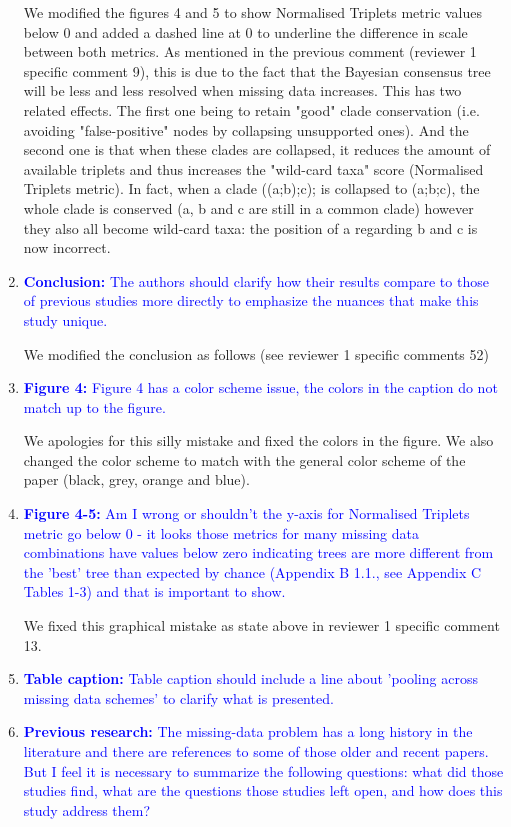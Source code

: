 \documentclass[12pt,letterpaper]{article}
\begin{document}
\begin{enumerate}
We modified the figures 4 and 5 to show Normalised Triplets metric values below 0 and added a dashed line at 0 to underline the difference in scale between both metrics.
As mentioned in the previous comment (reviewer 1 specific comment 9), this is due to the fact that the Bayesian consensus tree will be less and less resolved when missing data increases.
This has two related effects.
The first one being to retain "good" clade conservation (i.e. avoiding "false-positive" nodes by collapsing unsupported ones).
And the second one is that when these clades are collapsed, it reduces the amount of available triplets and thus increases the "wild-card taxa" score (Normalised Triplets metric).
In fact, when a clade ((a;b);c); is collapsed to (a;b;c), the whole clade is conserved (a, b and c are still in a common clade) however they also all become wild-card taxa: the position of a regarding b and c is now incorrect.


\item{\textcolor{blue}{\textbf{Conclusion:} The authors should clarify how their results compare to those of previous studies more directly to emphasize the nuances that make this study unique. }}

We modified the conclusion as follows (see reviewer 1 specific comments 52)

\item{\textcolor{blue}{\textbf{Figure 4:} Figure 4 has a color scheme issue, the colors in the caption do not match up to the figure.}}

We apologies for this silly mistake and fixed the colors in the figure. We also changed the color scheme to match with the general color scheme of the paper (black, grey, orange and blue).

\item{\textcolor{blue}{\textbf{Figure 4-5:} Am I wrong or shouldn't the y-axis for Normalised Triplets metric go below 0 - it looks those metrics for many missing data combinations have values below zero indicating trees are more different from the 'best' tree than expected by chance (Appendix B 1.1., see Appendix C Tables 1-3) and that is important to show.}}

We fixed this graphical mistake as state above in reviewer 1 specific comment 13.

\item{\textcolor{blue}{\textbf{Table caption:} Table caption should include a line about 'pooling across missing data schemes' to clarify what is presented.}}

\item{\textcolor{blue}{\textbf{Previous research:} The missing-data problem has a long history in the literature and there are references to some of those older and recent papers.
But I feel it is necessary to summarize the following questions: what did those studies find, what are the questions those studies left open, and how does this study address them?}}


\end{enumerate}
\end{document}
